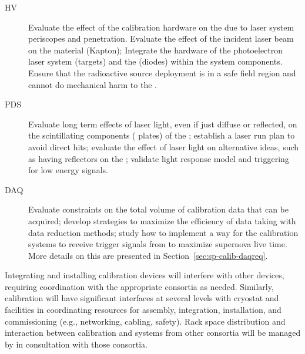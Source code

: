 \begin{description}
    \item[HV] Evaluate the effect of the calibration hardware on the \efield due to laser system periscopes and  penetration. %
    Evaluate the effect of the incident laser beam on the  material (Kapton); Integrate the hardware of the %
    photoelectron laser system (targets) and the  (diodes) within the  system components. Ensure that the radioactive source deployment is in a safe field region and cannot do mechanical harm to the .
    \item[PDS] Evaluate long term effects of laser light, even if just diffuse or reflected, on the scintillating components ( plates) of the ; establish a laser run plan to avoid direct hits; evaluate the effect of laser light on alternative  ideas, such as having reflectors on the ; validate light response model and triggering for low energy signals. 
    \item[DAQ] Evaluate  constraints on the total volume of calibration data that can be acquired; develop strategies to maximize the efficiency of data taking with data reduction methods; study how to implement a way for the calibration systems to receive trigger signals from  to maximize supernova live time. More details on this are presented in Section~\ref{sec:sp-calib-daqreq}.
\end{description}

Integrating and installing calibration devices will interfere with other devices, requiring coordination with the appropriate consortia as needed. Similarly, calibration will have significant interfaces at several levels with cryostat and facilities in coordinating resources for assembly, integration, installation, and commissioning (e.g., networking, cabling, safety). Rack space distribution and interaction between calibration and systems from other consortia will be managed by  in consultation with those consortia.

